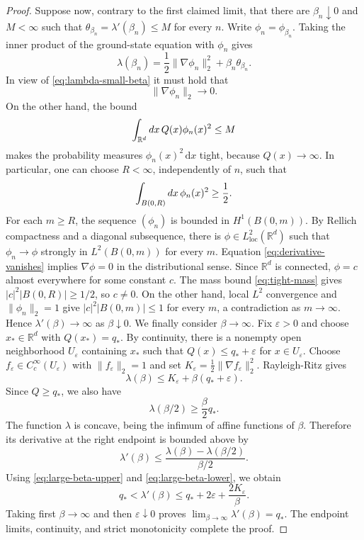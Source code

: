 \documentclass[10pt,a4paper]{amsart}
\def\de{{\rm d}}
\begin{document}
\begin{proof}
Suppose now, contrary to the first claimed limit, that there are
$\beta_n\downarrow0$ and $M<\infty$ such that $\theta_{\beta_n}=\lambda'(\beta_n)\leq M$ for every $n$.
Write $\phi_n=\phi_{\beta_n}$.  Taking the inner product of the
ground-state equation with $\phi_n$ gives
\[
    \lambda(\beta_n)
    =\frac12\|\nabla\phi_n\|_2^2
      +\beta_n\theta_{\beta_n}.
\]
In view of \eqref{eq:lambda-small-beta} it must hold that
\begin{equation}
    \|\nabla\phi_n\|_2\longrightarrow0.
\label{eq:derivative-vanishes}
\end{equation}
On the other hand, the bound
\[
    \int_{\mathbb R^d}\de x \, Q(x) \phi_n(x)^2 \leq M
\]
makes the probability measures $\phi_n(x)^2\,\mathrm dx$ tight, because
$Q(x)\to\infty$.  In particular, one can choose $R<\infty$, independently
of $n$, such that
\begin{equation}
    \int_{B(0,R)} \de x \, \phi_n(x)^2\geq\frac12.
\label{eq:tight-mass}
\end{equation}
For each $m\geq R$, the sequence $(\phi_n)$ is bounded in $H^1(B(0,m))$.
By Rellich compactness and a diagonal subsequence, there is
$\phi\in L^2_{\mathrm{loc}}(\mathbb R^d)$ such that
$\phi_n\to\phi$ strongly in $L^2(B(0,m))$ for every $m$.  Equation
\eqref{eq:derivative-vanishes} implies $\nabla\phi=0$ in the distributional
sense.  Since $\mathbb R^d$ is connected, $\phi=c$ almost everywhere for
some constant $c$.  The mass bound \eqref{eq:tight-mass} gives
$|c|^2|B(0,R)|\geq1/2$, so $c\neq0$.  On the other hand, local $L^2$
convergence and $\|\phi_n\|_2=1$ give
$|c|^2|B(0,m)|\leq1$ for every $m$, a contradiction as $m\to\infty$.
Hence
$\lambda'(\beta)\to\infty$ as $\beta\downarrow0$.
We finally consider $\beta\to\infty$.  Fix $\varepsilon>0$ and choose
$x_*\in\mathbb R^d$ with $Q(x_*)=q_*$.  By continuity, there is a nonempty
open neighborhood $U_\varepsilon$ containing $x_*$ such that $Q(x)\leq q_*+\varepsilon$ for $x\in U_\varepsilon$.
Choose $f_\varepsilon\in C_c^\infty(U_\varepsilon)$ with
$\|f_\varepsilon\|_2=1$ and set $K_\varepsilon=\frac12\|\nabla f_\varepsilon\|_2^2$.
Rayleigh-Ritz gives
\begin{equation}
    \lambda(\beta)
    \leq K_\varepsilon+\beta(q_*+\varepsilon).
\label{eq:large-beta-upper}
\end{equation}
Since $Q\geq q_*$, we also have
\begin{equation}
    \lambda(\beta/2)\geq\frac\beta2q_*.
\label{eq:large-beta-lower}
\end{equation}
The function $\lambda$ is concave, being the infimum of affine functions of
$\beta$.  Therefore its derivative at the right endpoint is bounded above by
\[
    \lambda'(\beta)
    \leq \frac{\lambda(\beta)-\lambda(\beta/2)}{\beta/2}.
\]
Using \eqref{eq:large-beta-upper} and \eqref{eq:large-beta-lower}, we obtain
\[
    q_*<\lambda'(\beta)
    \leq q_*+2\varepsilon+\frac{2K_\varepsilon}{\beta}.
\]
Taking first $\beta\to\infty$ and then $\varepsilon\downarrow0$ proves $\lim_{\beta\to\infty}\lambda'(\beta)=q_*$.
The endpoint limits, continuity, and strict monotonicity complete the proof.
\end{proof}
\end{document}
